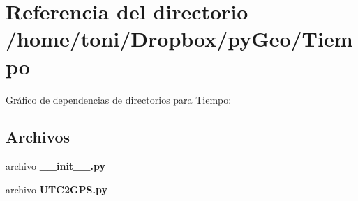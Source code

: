\section{Referencia del directorio /home/toni/\-Dropbox/py\-Geo/\-Tiempo}
\label{dir_22820bfa8ddbe89de5d62abfc27afc46}
Gráfico de dependencias de directorios para Tiempo\-:
\subsection*{Archivos}
\begin{DoxyCompactItemize}
\item 
archivo {\bf \-\_\-\-\_\-init\-\_\-\-\_\-.\-py}
\item 
archivo {\bf U\-T\-C2\-G\-P\-S.\-py}
\end{DoxyCompactItemize}
